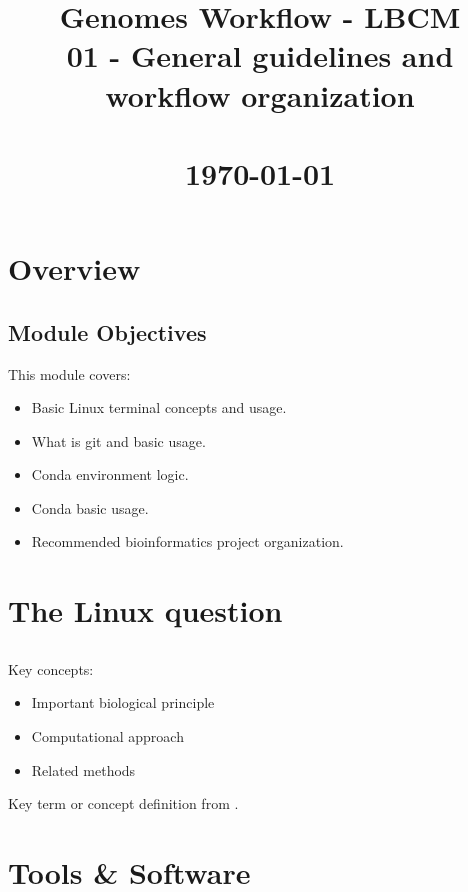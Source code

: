 \documentclass[a4paper,11pt]{article}
\title{
    \vfill
    \textcolor{noteblue}{\Huge Genomes Workflow - LBCM}\\
    \vspace{5.0cm}
    \textcolor{sidenotegray}{\huge 01 - General guidelines and workflow organization}\\
    \vspace{1.5cm}
    \textcolor{sidenotegray}{\LARGE }\\
    \vspace{5.0cm}
    \textcolor{sidenotegray}{\large \today}
    \vfill
}
\author{}
\date{}
\begin{document}
\maketitle
\thispagestyle{empty}
\newpage
\tableofcontents
\newpage
\section{Overview}

\subsection{Module Objectives}

This module covers:
\begin{itemize}
    \item Basic Linux terminal concepts and usage.
    \item What is git and basic usage.
    \item Conda environment logic.
    \item Conda basic usage.
    \item Recommended bioinformatics project organization.
\end{itemize}

\section{The Linux question}

\subsection{}

Key concepts:
\begin{itemize}
    \item Important biological principle \cite{example2024}
    \item Computational approach \citep{author2024}
    \item Related methods \citet{smith2024}
\end{itemize}

\begin{definition}
Key term or concept definition from \cite{author2024}.
\end{definition}

\section{Tools \& Software}
\end{document}
